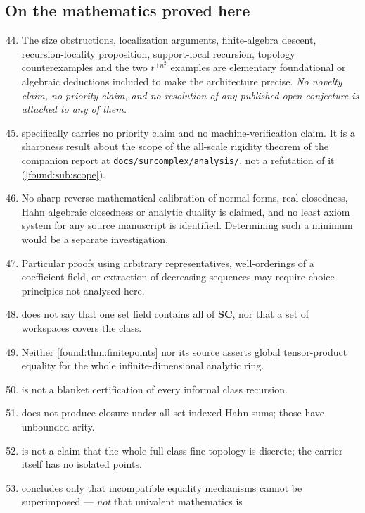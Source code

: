 \documentclass[11pt,letterpaper]{article}
\numberwithin{equation}{section}
\theoremstyle{definition}
\theoremstyle{remark}
\newcommand{\SC}{\mathbf{SC}}
\begin{document}
\subsection{On the mathematics proved here}
\label{found:app:limmath}
\begin{enumerate}\setcounter{enumi}{43}
\item The size obstructions, localization arguments, finite-algebra descent,
recursion-locality proposition, support-local recursion, topology
counterexamples and the two $t^{\pm n^2}$ examples are elementary foundational or
algebraic deductions included to make the architecture precise. \emph{No novelty
claim, no priority claim, and no resolution of any published open conjecture is
attached to any of them.}
\item {} specifically carries no priority claim and no
machine-verification claim. It is a sharpness result about the scope of the
all-scale rigidity theorem of the companion report at
\texttt{docs/surcomplex/analysis/}, not a refutation of it
(\cref{found:sub:scope}).
\item No sharp reverse-mathematical calibration of normal forms, real
closedness, Hahn algebraic closedness or analytic duality is claimed, and no
least axiom system for any source manuscript is identified. Determining such a
minimum would be a separate investigation.
\item Particular proofs using arbitrary representatives, well-orderings of a
coefficient field, or extraction of decreasing sequences may require choice
principles not analysed here.
\item {} does not say that one set field contains all of
$\SC$, nor that a set of workspaces covers the class.
\item Neither \cref{found:thm:finitepoints} nor its source asserts global
tensor-product equality for the whole infinite-dimensional analytic ring.
\item {} is not a blanket certification of every
informal class recursion.
\item {} does not produce closure under all set-indexed
Hahn sums; those have unbounded arity.
\item {} is not a claim that the whole full-class fine
topology is discrete; the carrier itself has no isolated points.
\item {} concludes only that incompatible equality
mechanisms cannot be superimposed --- \emph{not} that univalent mathematics is

\end{enumerate}
\end{document}
